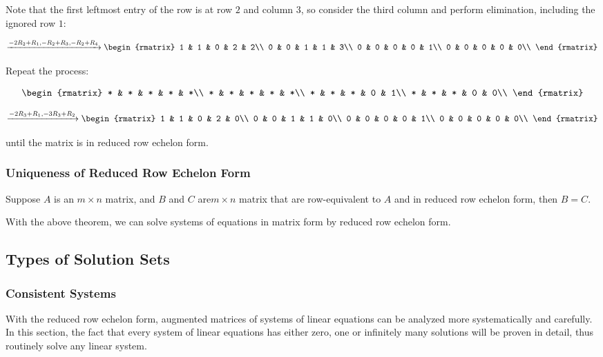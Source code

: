 \documentclass[a4paper,12pt]{article}
\begin{document}
\begin{exm}
  Note that the first leftmost entry of the row is at row $2$ and column $3$, so consider the third column and perform elimination, including the ignored row $1$:

  $$\xrightarrow[ ]{-2R_{2}+R_{1},-R_{2}+R_{3},-R_{2}+R_{4}}\begin{rmatrix}
  1 & 1 & 0 & 2 & 2\\
  0 & 0 & 1 & 1 & 3\\
  0 & 0 & 0 & 0 & 1\\
  0 & 0 & 0 & 0 & 0\\
  \end{rmatrix}$$\s

  Repeat the process:

  $$\begin{rmatrix}
  * & * & * & * & *\\
  * & * & * & * & *\\
  * & * & * & 0 & 1\\
  * & * & * & 0 & 0\\
  \end{rmatrix}$$\s

  $$\xrightarrow[ ]{-2R_{3}+R_{1},-3R_{3}+R_{2}}\begin{rmatrix}
  1 & 1 & 0 & 2 & 0\\
  0 & 0 & 1 & 1 & 0\\
  0 & 0 & 0 & 0 & 1\\
  0 & 0 & 0 & 0 & 0\\
  \end{rmatrix}$$\s

  until the matrix is in reduced row echelon form.
\end{exm}

\subsubsection{Uniqueness of Reduced Row Echelon Form}
\begin{thm}
  Suppose $A$ is an $m\times n$ matrix, and $B$ and $C$ are$m\times n$ matrix that are row-equivalent to $A$ and in reduced row echelon form, then $B=C$.
\end{thm}\n

With the above theorem, we can solve systems of equations in matrix form by reduced row echelon form.

\subsection{Types of Solution Sets}
\subsubsection{Consistent Systems}
With the reduced row echelon form, augmented matrices of systems of linear equations can be analyzed more systematically and carefully. In this section, the fact that every system of linear equations has either zero, one or infinitely many solutions will be proven in detail, thus routinely solve any linear system.\n
\end{document}

